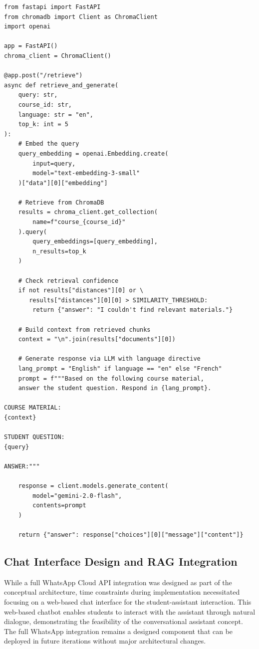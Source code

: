 \documentclass[a4paper,9pt,twocolumn]{extarticle}
\begin{document}
\begin{verbatim}
from fastapi import FastAPI
from chromadb import Client as ChromaClient
import openai

app = FastAPI()
chroma_client = ChromaClient()

@app.post("/retrieve")
async def retrieve_and_generate(
    query: str,
    course_id: str,
    language: str = "en",
    top_k: int = 5
):
    # Embed the query
    query_embedding = openai.Embedding.create(
        input=query,
        model="text-embedding-3-small"
    )["data"][0]["embedding"]
    
    # Retrieve from ChromaDB
    results = chroma_client.get_collection(
        name=f"course_{course_id}"
    ).query(
        query_embeddings=[query_embedding],
        n_results=top_k
    )
    
    # Check retrieval confidence
    if not results["distances"][0] or \
       results["distances"][0][0] > SIMILARITY_THRESHOLD:
        return {"answer": "I couldn't find relevant materials."}
    
    # Build context from retrieved chunks
    context = "\n".join(results["documents"][0])
    
    # Generate response via LLM with language directive
    lang_prompt = "English" if language == "en" else "French"
    prompt = f"""Based on the following course material, 
    answer the student question. Respond in {lang_prompt}.
    
COURSE MATERIAL:
{context}

STUDENT QUESTION:
{query}

ANSWER:"""
    
    response = client.models.generate_content(
        model="gemini-2.0-flash",
        contents=prompt
    )
    
    return {"answer": response["choices"][0]["message"]["content"]}
\end{verbatim}
\label{lst:rag-retrieval}

\subsection{Chat Interface Design and RAG Integration}
\label{sec:impl:chat}

While a full WhatsApp Cloud API integration was designed as part of the conceptual architecture, time constraints during implementation necessitated focusing on a web-based chat interface for the student-assistant interaction. This web-based chatbot enables students to interact with the assistant through natural dialogue, demonstrating the feasibility of the conversational assistant concept. The full WhatsApp integration remains a designed component that can be deployed in future iterations without major architectural changes.
\end{document}
